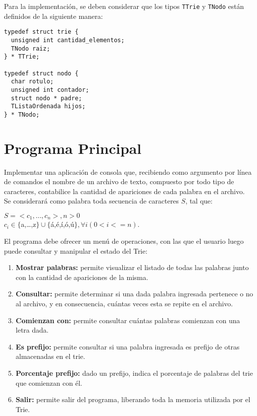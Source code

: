 \documentclass[12pt,a4paper]{article}
\begin{document}
Para la implementación, se deben considerar que los tipos \texttt{TTrie} y \texttt{TNodo} están definidos de la siguiente manera:

\begin{verbatim}
typedef struct trie {
  unsigned int cantidad_elementos;
  TNodo raiz;
} * TTrie;

typedef struct nodo {
  char rotulo;
  unsigned int contador;
  struct nodo * padre;
  TListaOrdenada hijos;
} * TNodo;

\end{verbatim}

\section{Programa Principal}
Implementar una aplicación de consola que, recibiendo como argumento por línea de comandos el nombre de un archivo de texto, compuesto por todo tipo de caracteres, contabilice la cantidad de apariciones de cada palabra en el archivo. Se considerará como palabra toda secuencia de caracteres $S$, tal que:
\begin{center}
$S=<c_1,\dots,c_n>, n>0$\\
$c_i \in \{$a,\dots,z$\} \cup \{$á,é,í,ó,ú$\}, \forall{i} (0<i<=n)$.
\end{center}

El programa debe ofrecer un menú de operaciones, con las que el usuario luego puede consultar y manipular el estado del Trie:
\begin{enumerate}	
	\item \textbf{Mostrar palabras:} permite visualizar el listado de todas las palabras junto con la cantidad de apariciones de la misma.
	
	\item \textbf{Consultar:} permite determinar si una dada palabra ingresada pertenece o no al archivo, y en consecuencia, cuántas veces esta se repite en el archivo.
	
	\item \textbf{Comienzan con:} permite consultar cuántas palabras comienzan con una letra dada.
	
	\item \textbf{Es prefijo:} permite consultar si una palabra ingresada es prefijo de otras almacenadas en el trie.

	\item \textbf{Porcentaje prefijo:} dado un prefijo, indica el porcentaje de palabras del trie que comienzan con él. 
	
	\item \textbf{Salir:} permite salir del programa, liberando toda la memoria utilizada por el Trie.
\end{enumerate}
	
\end{document}
